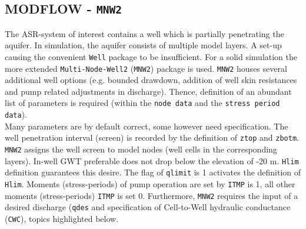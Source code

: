 \subsection{MODFLOW - \texttt{MNW2}}
\label{subsec:MODFLOW_MNW2}
The ASR-system of interest contains a well which is partially penetrating the aquifer. In simulation, the aquifer consists of multiple model layers. A set-up causing the convenient \texttt{Well} package to be insufficient. For a solid simulation the more extended \texttt{Multi-Node-Well2} (\texttt{MNW2}) package is used. \texttt{MNW2} houses several additional well options (e.g. bounded drawdown, addition of well skin resistances and pump related adjustments in discharge). Thence, definition of an abundant list of parameters is required (within the \texttt{node data} and the \texttt{stress period data})\citep{LeonardF.KonikowGeorgeZ.HornbergerKeithJ.Halford2009}.  \\

Many parameters are by default correct, some however need specification. The well penetration interval (screen) is recorded by the definition of \texttt{ztop} and \texttt{zbotm}. \texttt{MNW2} assigns the well screen to model nodes (well cells in the corresponding layers). In-well GWT preferable does not drop below the elevation of -20 m. \texttt{Hlim} definition guarantees this desire. The flag of \texttt{qlimit} is 1 activates the definition of \texttt{Hlim}. Moments (stress-periods) of pump operation are set by \texttt{ITMP} is 1, all other moments (stress-periods) \texttt{ITMP} is set 0. Furthermore, \texttt{MNW2} requires the input of a desired discharge (\texttt{qdes} and specification of Cell-to-Well hydraulic conductance (\texttt{CWC}), topics highlighted below. \\

